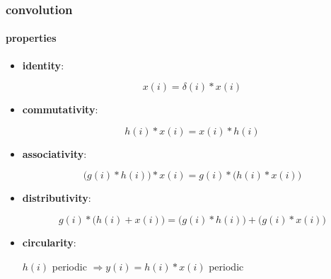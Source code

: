         \begin{frame}\frametitle{convolution}\framesubtitle{properties}
            \begin{itemize}
                \item<1->	\textbf{identity}:
                        \begin{footnotesize}\begin{equation*}
                            x(i) = \delta(i)\ast x(i)
                        \end{equation*}\end{footnotesize}
                \item<2->	\textbf{commutativity}: 
                        \begin{footnotesize}\begin{equation*}
                            h(i) \ast x(i)	= x(i) \ast h(i) 
                        \end{equation*}\end{footnotesize}
                \item<3->	\textbf{associativity}:
                        \begin{footnotesize}\begin{equation*}
                            \big(g(i) \ast h(i)\big) \ast x(i) = g(i) \ast \big(h(i) \ast x(i)\big)
                        \end{equation*}\end{footnotesize}
                \item<4->	\textbf{distributivity}:
                            \begin{footnotesize}\begin{equation*}
                                g(i) \ast \big(h(i) + x(i)\big) = \big(g(i) \ast h(i)\big) + \big(g(i) \ast x(i)\big)
                            \end{equation*}\end{footnotesize}
                \item<5->	\textbf{circularity}:\\
                        \begin{footnotesize}
                        $h(i)$ periodic $\Rightarrow y(i) = h(i) \ast x(i)$ periodic
                        \end{footnotesize}
            \end{itemize}
        \end{frame}	
        
